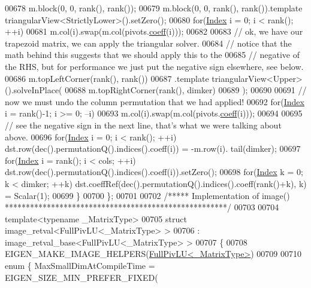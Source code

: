 \begin{DoxyCode}
00678     m.block(0, 0, rank(), rank());
00679     m.block(0, 0, rank(), rank()).template triangularView<StrictlyLower>().setZero();
00680     \textcolor{keywordflow}{for}(\hyperlink{group___core___module_a554f30542cc2316add4b1ea0a492ff02}{Index} i = 0; i < rank(); ++i)
00681       m.col(i).swap(m.col(pivots.\hyperlink{class_eigen_1_1_plain_object_base_afbfc12954f16d21aedb7bd839f64a278}{coeff}(i)));
00682 
00683     \textcolor{comment}{// ok, we have our trapezoid matrix, we can apply the triangular solver.}
00684     \textcolor{comment}{// notice that the math behind this suggests that we should apply this to the}
00685     \textcolor{comment}{// negative of the RHS, but for performance we just put the negative sign elsewhere, see below.}
00686     m.topLeftCorner(rank(), rank())
00687      .template triangularView<Upper>().solveInPlace(
00688         m.topRightCorner(rank(), dimker)
00689       );
00690 
00691     \textcolor{comment}{// now we must undo the column permutation that we had applied!}
00692     \textcolor{keywordflow}{for}(\hyperlink{group___core___module_a554f30542cc2316add4b1ea0a492ff02}{Index} i = rank()-1; i >= 0; --i)
00693       m.col(i).swap(m.col(pivots.\hyperlink{class_eigen_1_1_plain_object_base_afbfc12954f16d21aedb7bd839f64a278}{coeff}(i)));
00694 
00695     \textcolor{comment}{// see the negative sign in the next line, that's what we were talking about above.}
00696     \textcolor{keywordflow}{for}(\hyperlink{group___core___module_a554f30542cc2316add4b1ea0a492ff02}{Index} i = 0; i < rank(); ++i) dst.row(dec().permutationQ().indices().coeff(i)) = -m.row(i).
      tail(dimker);
00697     \textcolor{keywordflow}{for}(\hyperlink{group___core___module_a554f30542cc2316add4b1ea0a492ff02}{Index} i = rank(); i < cols; ++i) dst.row(dec().permutationQ().indices().coeff(i)).setZero();
00698     \textcolor{keywordflow}{for}(\hyperlink{group___core___module_a554f30542cc2316add4b1ea0a492ff02}{Index} k = 0; k < dimker; ++k) dst.coeffRef(dec().permutationQ().indices().coeff(rank()+k), k) 
      = Scalar(1);
00699   \}
00700 \};
00701 
00702 \textcolor{comment}{/***** Implementation of image() *****************************************************/}
00703 
00704 \textcolor{keyword}{template}<\textcolor{keyword}{typename} \_MatrixType>
00705 \textcolor{keyword}{struct }image\_retval<FullPivLU<\_MatrixType> >
00706   : image\_retval\_base<FullPivLU<\_MatrixType> >
00707 \{
00708   EIGEN\_MAKE\_IMAGE\_HELPERS(\hyperlink{group___l_u___module_class_eigen_1_1_full_piv_l_u}{FullPivLU<\_MatrixType>})
00709 
00710   \textcolor{keyword}{enum} \{ MaxSmallDimAtCompileTime = EIGEN\_SIZE\_MIN\_PREFER\_FIXED(

\end{DoxyCode}
